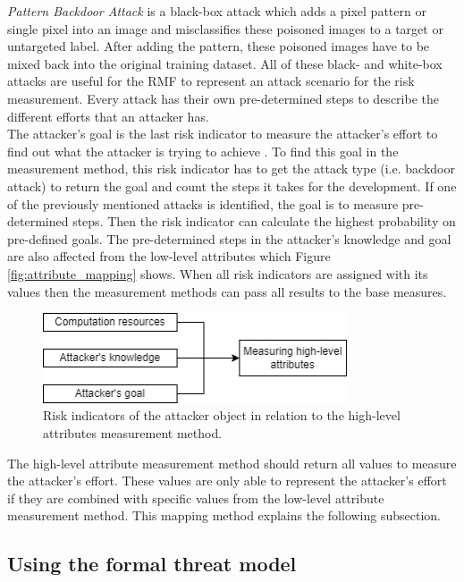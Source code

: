 \textit{Pattern Backdoor Attack} \cite{DBLP:journals/corr/abs-1708-06733} is a black-box attack which adds a pixel pattern or single pixel into an image and misclassifies these poisoned images to a target or untargeted label. After adding the pattern, these poisoned images have to be mixed back into the original training dataset. All of these black- and white-box attacks are useful for the RMF to represent an attack scenario for the risk measurement. Every attack has their own pre-determined steps to describe the different efforts that an attacker has. \\
The attacker's goal is the last risk indicator to measure the attacker's effort to find out what the attacker is trying to achieve \cite{DBLP:journals/corr/abs-2012-04884}. To find this goal in the measurement method, this risk indicator has to get the attack type (i.e. backdoor attack) to return the goal and count the steps it takes for the development. If one of the previously mentioned attacks is identified, the goal is to measure pre-determined steps. Then the risk indicator can calculate the highest probability on pre-defined goals. The pre-determined steps in the attacker's knowledge and goal are also affected from the low-level attributes which Figure \ref{fig:attribute_mapping} shows. When all risk indicators are assigned with its values then the measurement methods can pass all results to the base measures.

\begin{figure}[ht!]
  \centering
  \includegraphics[width=9cm]{pictures/measure_effort.png}
  \caption{Risk indicators of the attacker object in relation to the high-level attributes measurement method.}
  \label{fig:measure_effort}
\end{figure}

The high-level attribute measurement method should return all values to measure the attacker's effort. These values are only able to represent the attacker's effort if they are combined with specific values from the low-level attribute measurement method. This mapping method explains the following subsection.

\subsection{Using the formal threat model}
\label{sec:use_threat_model}

